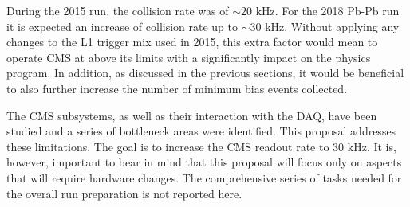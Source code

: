 During the 2015 run, the collision rate was of $\sim 20$ kHz. For the 2018 Pb-Pb run it is expected an increase of collision rate up to $\sim 30$ kHz. Without applying any changes to the L1 trigger mix used in 2015, this extra factor would mean to operate CMS at above its limits with a significantly impact on the physics program. In addition, as discussed in the previous sections, it would be beneficial to also further increase the number of minimum bias events collected. 

The CMS subsystems, as well as their interaction with the DAQ, have been studied and a series of bottleneck areas were identified. This proposal addresses these limitations. The goal is to increase the CMS readout rate to 30 kHz. It is, however, important to bear in mind that this proposal will focus only on aspects that will require
hardware changes. The comprehensive series of tasks needed for the overall run preparation is not reported here. 

